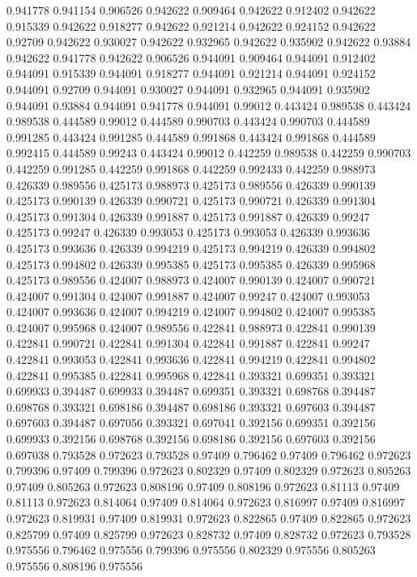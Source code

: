 0.941778 0.941154
0.906526 0.942622
0.909464 0.942622
0.912402 0.942622
0.915339 0.942622
0.918277 0.942622
0.921214 0.942622
0.924152 0.942622
0.92709 0.942622
0.930027 0.942622
0.932965 0.942622
0.935902 0.942622
0.93884 0.942622
0.941778 0.942622
0.906526 0.944091
0.909464 0.944091
0.912402 0.944091
0.915339 0.944091
0.918277 0.944091
0.921214 0.944091
0.924152 0.944091
0.92709 0.944091
0.930027 0.944091
0.932965 0.944091
0.935902 0.944091
0.93884 0.944091
0.941778 0.944091
0.99012 0.443424
0.989538 0.443424
0.989538 0.444589
0.99012 0.444589
0.990703 0.443424
0.990703 0.444589
0.991285 0.443424
0.991285 0.444589
0.991868 0.443424
0.991868 0.444589
0.992415 0.444589
0.99243 0.443424
0.99012 0.442259
0.989538 0.442259
0.990703 0.442259
0.991285 0.442259
0.991868 0.442259
0.992433 0.442259
0.988973 0.426339
0.989556 0.425173
0.988973 0.425173
0.989556 0.426339
0.990139 0.425173
0.990139 0.426339
0.990721 0.425173
0.990721 0.426339
0.991304 0.425173
0.991304 0.426339
0.991887 0.425173
0.991887 0.426339
0.99247 0.425173
0.99247 0.426339
0.993053 0.425173
0.993053 0.426339
0.993636 0.425173
0.993636 0.426339
0.994219 0.425173
0.994219 0.426339
0.994802 0.425173
0.994802 0.426339
0.995385 0.425173
0.995385 0.426339
0.995968 0.425173
0.989556 0.424007
0.988973 0.424007
0.990139 0.424007
0.990721 0.424007
0.991304 0.424007
0.991887 0.424007
0.99247 0.424007
0.993053 0.424007
0.993636 0.424007
0.994219 0.424007
0.994802 0.424007
0.995385 0.424007
0.995968 0.424007
0.989556 0.422841
0.988973 0.422841
0.990139 0.422841
0.990721 0.422841
0.991304 0.422841
0.991887 0.422841
0.99247 0.422841
0.993053 0.422841
0.993636 0.422841
0.994219 0.422841
0.994802 0.422841
0.995385 0.422841
0.995968 0.422841
0.393321 0.699351
0.393321 0.699933
0.394487 0.699933
0.394487 0.699351
0.393321 0.698768
0.394487 0.698768
0.393321 0.698186
0.394487 0.698186
0.393321 0.697603
0.394487 0.697603
0.394487 0.697056
0.393321 0.697041
0.392156 0.699351
0.392156 0.699933
0.392156 0.698768
0.392156 0.698186
0.392156 0.697603
0.392156 0.697038
0.793528 0.972623
0.793528 0.97409
0.796462 0.97409
0.796462 0.972623
0.799396 0.97409
0.799396 0.972623
0.802329 0.97409
0.802329 0.972623
0.805263 0.97409
0.805263 0.972623
0.808196 0.97409
0.808196 0.972623
0.81113 0.97409
0.81113 0.972623
0.814064 0.97409
0.814064 0.972623
0.816997 0.97409
0.816997 0.972623
0.819931 0.97409
0.819931 0.972623
0.822865 0.97409
0.822865 0.972623
0.825799 0.97409
0.825799 0.972623
0.828732 0.97409
0.828732 0.972623
0.793528 0.975556
0.796462 0.975556
0.799396 0.975556
0.802329 0.975556
0.805263 0.975556
0.808196 0.975556
